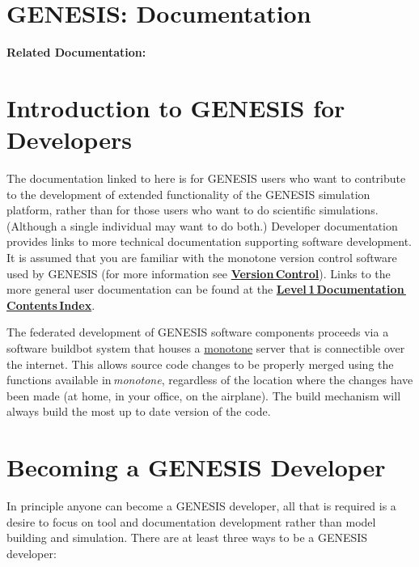 \documentclass[12pt]{article}
\begin{document}
\section*{GENESIS: Documentation}

{\bf Related Documentation:}

\section*{Introduction to GENESIS for Developers}

The documentation linked to here is for GENESIS users who want to contribute to the development of extended functionality of the GENESIS simulation platform, rather than for those users who want to do scientific simulations. (Although a single individual may want to do both.) Developer documentation provides links to more technical documentation supporting software development. It is assumed that you are familiar with the monotone version control software used by GENESIS (for more information see \href{../version-control/version-control.tex}{\bf Version\,Control}). Links to the more general user documentation can be found at the \href{http://www.genesis-sim.org/userdocs/contents-level1/contents-level1.html}{\bf Level\,1\,Documentation\,Contents\,Index}. 

The federated development of GENESIS software components proceeds via a software buildbot system that houses a \href{http://monotone.ca/}{monotone} server that is connectible over the internet. This allows source code changes to be properly merged using the functions available in\,{\it monotone}, regardless of the location where the changes have been made (at home, in your office, on the airplane). The build mechanism will always build the most up to date version of the code.

\section*{Becoming a GENESIS Developer}

In principle anyone can become a GENESIS developer, all that is required is a desire to focus on tool and documentation development rather than model building and simulation. There are at least three ways to be a GENESIS  developer:
\end{document}
